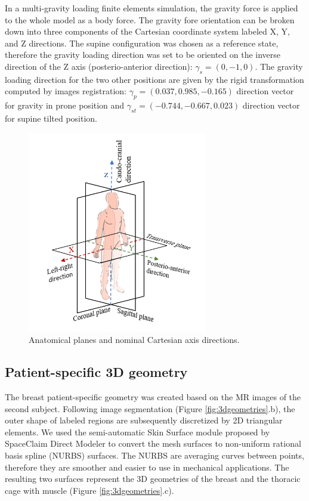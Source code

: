 In a multi-gravity loading finite elements simulation, the gravity force is applied to the whole model as a body force. The gravity fore orientation can be broken down into three components of the Cartesian coordinate system labeled X, Y, and Z directions. The supine configuration was chosen as a reference state, therefore the gravity loading direction was set to be oriented on the inverse direction of the Z axis (posterio-anterior direction): $\gamma_s = (0,-1,0)$.   The gravity loading direction for the two other positions are given by the rigid transformation computed by images registration: $\gamma_p = (0.037, 0.985, -0.165)$ direction vector for gravity in prone position and $\gamma_{st} = (-0.744 , -0.667, 0.023)$ direction vector for supine tilted position.

\begin{figure}[!ht]
\centering
\includegraphics[width=0.7\textwidth,keepaspectratio]{figures/xyz_axis_directions.png} 
\caption{Anatomical planes and nominal Cartesian axis directions.}\label{fig:xyz_axis_directions}
\end{figure}

\subsection{Patient-specific 3D geometry}

\label{subsection:patientspecificgeometry}

The breast patient-specific geometry was created based on the MR images of the second subject. Following image segmentation (Figure \ref{fig:3dgeometries}.b), the outer shape of labeled regions are subsequently discretized by 2D triangular elements.  We used the semi-automatic Skin Surface module proposed by SpaceClaim Direct Modeler to convert the mesh surfaces to non-uniform rational basis spline (NURBS) surfaces. The NURBS are averaging curves between points, therefore they are smoother and easier to use in mechanical applications. The resulting two surfaces represent the 3D geometries of the breast and the thoracic cage with muscle (Figure \ref{fig:3dgeometries}.c).   
 

